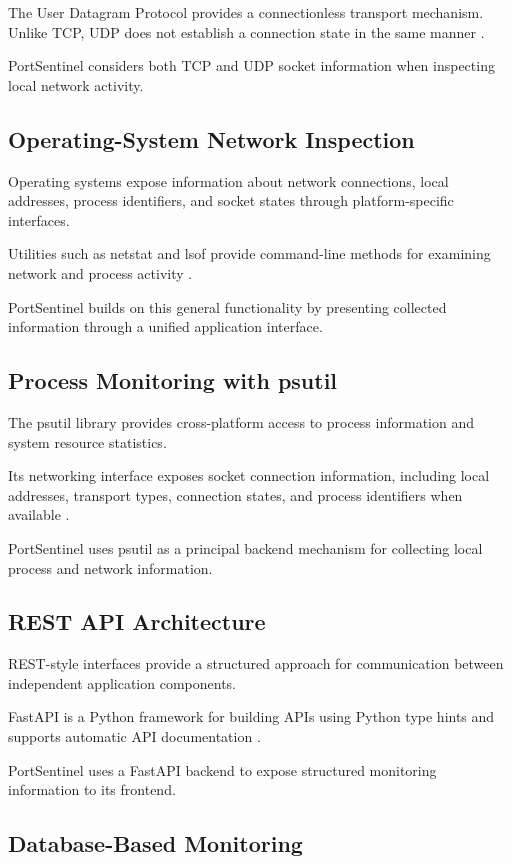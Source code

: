 \documentclass[conference]{IEEEtran}
\begin{document}
The User Datagram Protocol provides a connectionless
transport mechanism. Unlike TCP, UDP does not establish
a connection state in the same manner \cite{udp}.

PortSentinel considers both TCP and UDP socket information
when inspecting local network activity.

\subsection{Operating-System Network Inspection}

Operating systems expose information about network
connections, local addresses, process identifiers,
and socket states through platform-specific interfaces.

Utilities such as netstat and lsof provide command-line
methods for examining network and process activity
\cite{netstat,lsof}.

PortSentinel builds on this general functionality by
presenting collected information through a unified
application interface.

\subsection{Process Monitoring with psutil}

The psutil library provides cross-platform access to
process information and system resource statistics.

Its networking interface exposes socket connection
information, including local addresses, transport types,
connection states, and process identifiers when
available \cite{psutil}.

PortSentinel uses psutil as a principal backend mechanism
for collecting local process and network information.

\subsection{REST API Architecture}

REST-style interfaces provide a structured approach
for communication between independent application
components.

FastAPI is a Python framework for building APIs using
Python type hints and supports automatic API documentation
\cite{fastapi}.

PortSentinel uses a FastAPI backend to expose structured
monitoring information to its frontend.

\subsection{Database-Based Monitoring}
\end{document}
